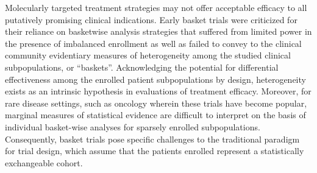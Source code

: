 Molecularly targeted treatment strategies may not offer acceptable efficacy to all putatively promising clinical indications. Early basket trials were criticized for their reliance on basketwise analysis strategies that suffered from limited power in the presence of imbalanced enrollment as well as failed to convey to the clinical community evidentiary measures of heterogeneity among the studied clinical subpopulations, or ``baskets''. Acknowledging the potential for differential effectiveness among the enrolled patient subpopulations by design, heterogeneity exists as an intrinsic hypothesis in  evaluations of treatment efficacy. Moreover, for rare disease settings, such as oncology wherein these trials have become popular, marginal measures of statistical evidence are difficult to interpret on the basis of individual basket-wise analyses for sparsely enrolled subpopulations. Consequently, basket trials pose specific challenges to the traditional paradigm for trial design, which assume that the patients enrolled represent a statistically exchangeable cohort.

